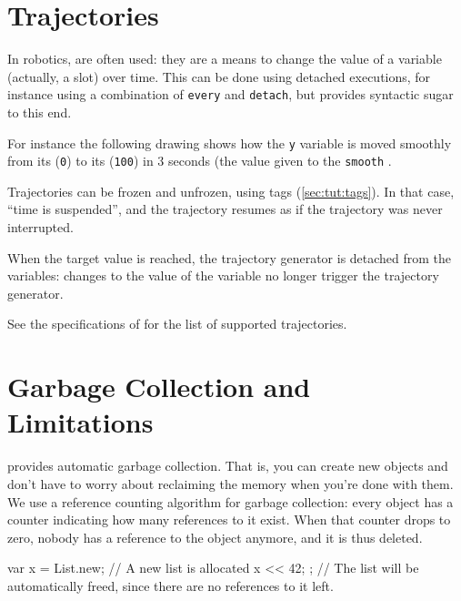 \section{Trajectories}
\label{sec:lang:traj}

In robotics,  are often used: they are a
means to change the value of a variable (actually, a slot) over time.
This can be done using detached executions, for instance using a
combination of \lstinline|every| and \lstinline|detach|, but \us
provides syntactic sugar to this end.

For instance the following drawing shows how the \lstinline|y|
variable is moved smoothly from its 
(\lstinline|0|) to its  (\lstinline|100|) in 3
seconds (the value given to the \lstinline|smooth| .


Trajectories can be frozen and unfrozen, using tags
(\autoref{sec:tut:tags}).  In that case, ``time is suspended'', and
the trajectory resumes as if the trajectory was never interrupted.


When the target value is reached, the trajectory generator is detached
from the variables: changes to the value of the variable no longer
trigger the trajectory generator.


See the specifications of  for the list
of supported trajectories.

\section{Garbage Collection and Limitations}
\label{sec:lang:gc}

\us provides automatic garbage collection. That is, you can create new
objects and don't have to worry about reclaiming the memory when you're done
with them. We use a reference counting algorithm for garbage collection:
every object has a counter indicating how many references to it exist. When
that counter drops to zero, nobody has a reference to the object anymore,
and it is thus deleted.

\begin{urbiunchecked}
{
  var x = List.new; // A new list is allocated
  x << 42;
};
// The list will be automatically freed, since there are no references to it left.
\end{urbiunchecked}

